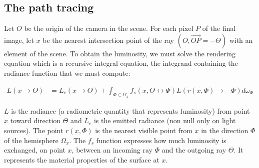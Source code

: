 %
%
%
%
%

\subsection{The path tracing}

Let $O$ be the origin of the camera in the scene. For each pixel $P$ of the final image, let $x$ be the nearest intersection point of the ray $(O, \overrightarrow{OP} = -\Theta)$ with an element of the scene. To obtain the luminosity, we must solve the rendering equation \cite{Ka86} which is a recursive integral equation, the integrand containing the radiance function that we must compute:

\begin{align*}
L(x \rightarrow \Theta) &= L_e(x \rightarrow \Theta) + \int_{\Phi \in \Omega_x} f_s(x, \Theta \leftrightarrow \Phi) L(r(x, \Phi) \rightarrow -\Phi) d\omega_\Phi
\end{align*}

$L$ is the radiance (a radiometric quantity that represents luminosity) from point $x$ toward direction $\Theta$ and $L_e$ is the emitted radiance (non null only on light sources). The point $r(x, \Phi)$ is the nearest visible point from $x$ in the direction $\Phi$ of the hemisphere $\Omega_x$. The $f_s$ function expresses how much luminosity is exchanged, on point $x$, between an incoming ray $\Phi$ and the outgoing ray $\Theta$. It represents the material properties of the surface at $x$.

